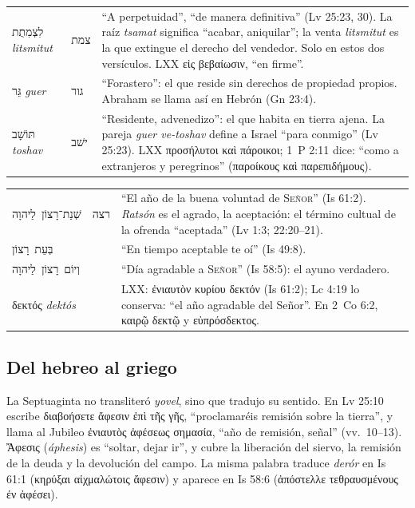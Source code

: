\documentclass[11pt,letterpaper]{article}
\newcommand{\heb}[1]{\mbox{\foreignlanguage{hebrew}{#1}}}
\newcommand{\grc}[1]{\foreignlanguage{ancientgreek}{#1}}
\newcommand{\SENOR}{\textsc{Señor}}
\begin{document}
\begin{filologia}
\begin{tabular}{@{}L{3.3cm}L{1.4cm}L{9.85cm}@{}}
\heb{לִצְמִתֻת} \emph{litsmitut} & \heb{צמת} & ``A perpetuidad'', ``de manera definitiva'' (Lv 25:23, 30). La raíz \emph{tsamat} significa ``acabar, aniquilar''; la venta \emph{litsmitut} es la que extingue el derecho del vendedor. Solo en estos dos versículos. LXX \grc{εἰς βεβαίωσιν}, ``en firme''. \\[2pt]
\heb{גֵּר} \emph{guer} & \heb{גור} & ``Forastero'': el que reside sin derechos de propiedad propios. Abraham se llama así en Hebrón (Gn 23:4). \\[2pt]
\heb{תּוֹשָׁב} \emph{toshav} & \heb{ישׁב} & ``Residente, advenedizo'': el que habita en tierra ajena. La pareja \emph{guer ve-toshav} define a Israel ``para conmigo'' (Lv 25:23). LXX \grc{προσήλυτοι καὶ πάροικοι}; 1~P 2:11 dice: ``como a extranjeros y peregrinos'' (\grc{παροίκους καὶ παρεπιδήμους}). \\
\end{tabular}
\end{filologia}

\begin{filologia}
\begin{tabular}{@{}L{3.3cm}L{1.4cm}L{9.85cm}@{}}
\heb{שְׁנַת־רָצוֹן לַיהוָה} & \heb{רצה} & ``El año de la buena voluntad de \SENOR'' (Is 61:2). \emph{Ratsón} es el agrado, la aceptación: el término cultual de la ofrenda ``aceptada'' (Lv 1:3; 22:20--21). \\[2pt]
\heb{בְּעֵת רָצוֹן} & & ``En tiempo aceptable te oí'' (Is 49:8). \\[2pt]
\heb{וְיוֹם רָצוֹן לַיהוָה} & & ``Día agradable a \SENOR'' (Is 58:5): el ayuno verdadero. \\[2pt]
\grc{δεκτός} \emph{dektós} & & LXX: \grc{ἐνιαυτὸν κυρίου δεκτόν} (Is 61:2); Lc 4:19 lo conserva: ``el año agradable del Señor''. En 2~Co 6:2, \grc{καιρῷ δεκτῷ} y \grc{εὐπρόσδεκτος}. \\
\end{tabular}
\end{filologia}

\subsection{Del hebreo al griego}
La Septuaginta no transliteró \emph{yovel}, sino que tradujo su sentido. En Lv 25:10 escribe \grc{διαβοήσετε ἄφεσιν ἐπὶ τῆς γῆς}, ``proclamaréis remisión sobre la tierra'', y llama al Jubileo \grc{ἐνιαυτὸς ἀφέσεως σημασία}, ``año de remisión, señal'' (vv.~10--13). \grc{Ἄφεσις} (\emph{áphesis}) es ``soltar, dejar ir'', y cubre la liberación del siervo, la remisión de la deuda y la devolución del campo. La misma palabra traduce \emph{derór} en Is 61:1 (\grc{κηρύξαι αἰχμαλώτοις ἄφεσιν}) y aparece en Is 58:6 (\grc{ἀπόστελλε τεθραυσμένους ἐν ἀφέσει}).
\end{document}
